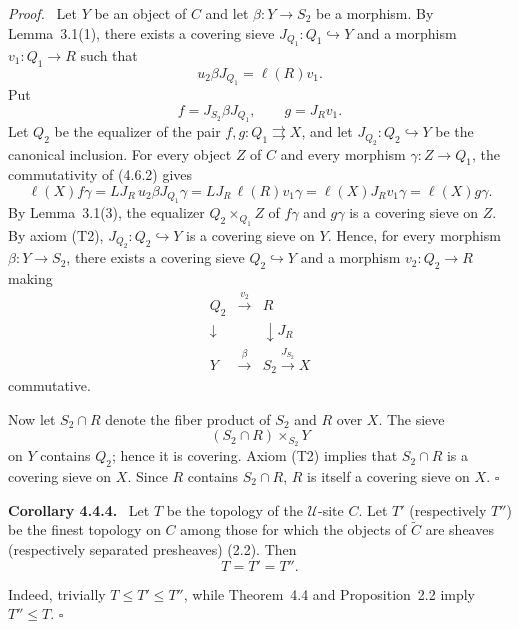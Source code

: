 \documentclass[11pt]{article}
\newcommand{\U}{\mathcal{U}}
\newcommand{\qedtext}{\hfill\(\square\)}
\newenvironment{statement}[1]{\par\medskip\noindent\textbf{#1.}\ }{\par\medskip}
\newenvironment{prooftext}{\par\noindent\emph{Proof.}\ }{\par\medskip}
\begin{document}
\begin{prooftext}
Let \(Y\) be an object of \(C\) and let \(\beta:Y\to S_2\) be a morphism. By Lemma~3.1(1), there exists a covering sieve \(J_{Q_1}:Q_1\hookrightarrow Y\) and a morphism \(v_1:Q_1\to R\) such that
\[
u_2\beta J_{Q_1}=\ell(R)v_1.
\]
Put
\[
f=J_{S_2}\beta J_{Q_1},\qquad g=J_Rv_1.
\]
Let \(Q_2\) be the equalizer of the pair \(f,g:Q_1\rightrightarrows X\), and let \(J_{Q_2}:Q_2\hookrightarrow Y\) be the canonical inclusion. For every object \(Z\) of \(C\) and every morphism \(\gamma:Z\to Q_1\), the commutativity of (4.6.2) gives
\[
\ell(X)f\gamma
=
LJ_R\,u_2\beta J_{Q_1}\gamma
=
LJ_R\,\ell(R)v_1\gamma
=
\ell(X)J_Rv_1\gamma
=
\ell(X)g\gamma.
\]
By Lemma~3.1(3), the equalizer \(Q_2\times_{Q_1}Z\) of \(f\gamma\) and \(g\gamma\) is a covering sieve on \(Z\). By axiom (T2), \(J_{Q_2}:Q_2\hookrightarrow Y\) is a covering sieve on \(Y\). Hence, for every morphism \(\beta:Y\to S_2\), there exists a covering sieve \(Q_2\hookrightarrow Y\) and a morphism \(v_2:Q_2\to R\) making
\[
\begin{array}{ccc}
Q_2&\xrightarrow{v_2}&R\\
\downarrow&&\downarrow J_R\\
Y&\xrightarrow{\beta}&S_2\xrightarrow{J_{S_2}}X
\end{array}
\]
commutative.

Now let \(S_2\cap R\) denote the fiber product of \(S_2\) and \(R\) over \(X\). The sieve
\[
(S_2\cap R)\times_{S_2}Y
\]
on \(Y\) contains \(Q_2\); hence it is covering. Axiom (T2) implies that \(S_2\cap R\) is a covering sieve on \(X\). Since \(R\) contains \(S_2\cap R\), \(R\) is itself a covering sieve on \(X\). \qedtext
\end{prooftext}

\begin{statement}{Corollary 4.4.4}
Let \(T\) be the topology of the \(\U\)-site \(C\). Let \(T'\) (respectively \(T''\)) be the finest topology on \(C\) among those for which the objects of \(\widetilde C\) are sheaves (respectively separated presheaves) (2.2). Then
\[
T=T'=T''.
\]
\end{statement}

Indeed, trivially \(T\le T'\le T''\), while Theorem~4.4 and Proposition~2.2 imply \(T''\le T\). \qedtext
\end{document}
